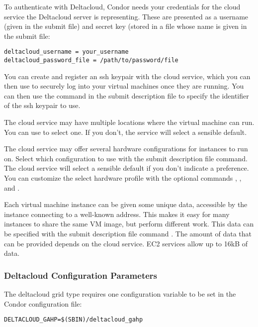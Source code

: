 To authenticate with Deltacloud, Condor needs your credentials for
the cloud service the Deltacloud server is representing. These are
presented as a username (given in the submit file) and secret key
(stored in a file whose name is given in the submit file:

\begin{verbatim}
deltacloud_username = your_username
deltacloud_password_file = /path/to/password/file
\end{verbatim}

You can create and register an ssh keypair with the cloud service,
which you can then use to securely log into your virtual machines
once they are running.
You can then use the command  in the
submit description file to specify the identifier of the ssh keypair
to use.

The cloud service may have multiple locations where the virtual
machine can run. You can use  to
select one. If you don't, the service will select a sensible default.

The cloud service may offer several hardware configurations for
instances to run on. Select which configuration to use with the
  submit description file
command. The cloud service will select a sensible default if you
don't indicate a preference.
You can customize the select hardware profile with the optional
commands ,
, and
.

Each virtual machine instance can be given some unique data, 
accessible by the instance connecting to a well-known address.
This makes it easy for many instances to share the same VM image,
but perform different work.
This data can be specified with the submit description file command
.
The amount of data that can be provided depends on the cloud service.
EC2 services allow up to 16kB of data.

\subsubsection{\label{sec:Deltacloud-config}Deltacloud Configuration Parameters}

The deltacloud grid type requires one configuration variable 
to be set in the Condor configuration file:

\footnotesize
\begin{verbatim}
DELTACLOUD_GAHP=$(SBIN)/deltacloud_gahp
\end{verbatim}
\normalsize
